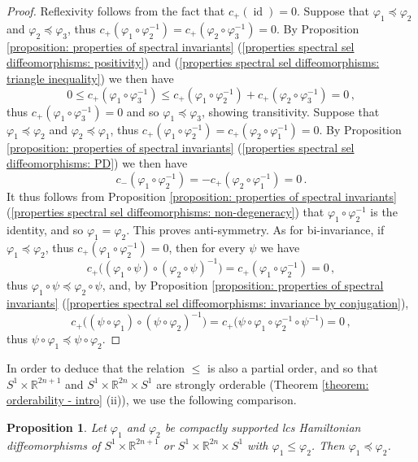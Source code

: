 \documentclass{amsart}
\DeclareMathOperator{\id}{id}
\newtheorem{prop}[thm]{Proposition}
\theoremstyle{remark}
\begin{document}
\begin{proof}
Reflexivity follows from the fact that $c_+ (\id) = 0$.
Suppose that $\varphi_1 \preceq \varphi_2$ and $\varphi_2 \preceq \varphi_3$,
thus $c_+ (\varphi_1 \circ \varphi_2^{-1}) = c_+ (\varphi_2 \circ \varphi_3^{-1}) = 0$.
By Proposition \ref{proposition: properties of spectral invariants}
(\ref{properties spectral sel diffeomorphisms: positivity})
and (\ref{properties spectral sel diffeomorphisms: triangle inequality})
we then have
\[
0 \leq c_+ (\varphi_1 \circ \varphi_3^{-1})
\leq c_+ (\varphi_1 \circ \varphi_2^{-1}) + c_+ (\varphi_2 \circ \varphi_3^{-1}) = 0 \,,
\]
thus $c_+ (\varphi_1 \circ \varphi_3^{-1}) = 0$
and so $\varphi_1 \preceq \varphi_3$,
showing transitivity.
Suppose that $\varphi_1 \preceq \varphi_2$ and $\varphi_2 \preceq \varphi_1$,
thus $c_+ (\varphi_1 \circ \varphi_2^{-1}) = c_+ (\varphi_2 \circ \varphi_1^{-1}) = 0$.
By Proposition \ref{proposition: properties of spectral invariants}
(\ref{properties spectral sel diffeomorphisms: PD})
we then have
\[
c_- (\varphi_1 \circ \varphi_2^{-1})
= - c_+ (\varphi_2 \circ \varphi_1^{-1}) = 0 \,.
\]
It thus follows
from Proposition \ref{proposition: properties of spectral invariants}
(\ref{properties spectral sel diffeomorphisms: non-degeneracy})
that $\varphi_1 \circ \varphi_2^{-1}$ is the identity,
and so $\varphi_1 = \varphi_2$.
This proves anti-symmetry.
As for bi-invariance,
if $\varphi_1 \preceq \varphi_2$,
thus $c_+ (\varphi_1 \circ \varphi_2^{-1}) = 0$,
then for every $\psi$ we have
\[
c_+ \big( (\varphi_1 \circ \psi) \circ (\varphi_2 \circ \psi)^{-1}\big)
= c_+ (\varphi_1 \circ \varphi_2^{-1})= 0 \,,
\]
thus $\varphi_1 \circ \psi \preceq \varphi_2 \circ \psi$,
and, by Proposition \ref{proposition: properties of spectral invariants}
(\ref{properties spectral sel diffeomorphisms: invariance by conjugation}),
\[
c_+ \big( (\psi \circ \varphi_1) \circ (\psi \circ \varphi_2)^{-1}\big)
= c_+ \big( \psi \circ \varphi_1 \circ \varphi_2^{-1} \circ \psi^{-1} \big) = 0 \,,
\]
thus $\psi \circ \varphi_1 \preceq \psi \circ \varphi_2$.
\end{proof}

In order to deduce that the relation $\leq$
is also a partial order,
and so that $S^1 \times \mathbb{R}^{2n+1}$ and $S^1 \times \mathbb{R}^{2n} \times S^1$
are strongly orderable
(Theorem \ref{theorem: orderability - intro} (ii)),
we use the following comparison.

\begin{prop}\label{proposition: comparison po}
Let $\varphi_1$ and $\varphi_2$ be compactly supported
lcs Hamiltonian diffeomorphisms of $S^1 \times \mathbb{R}^{2n+1}$
or $S^1 \times \mathbb{R}^{2n} \times S^1$
with $\varphi_1 \leq \varphi_2$.
Then $\varphi_1 \preceq \varphi_2$.
\end{prop}
\end{document}
